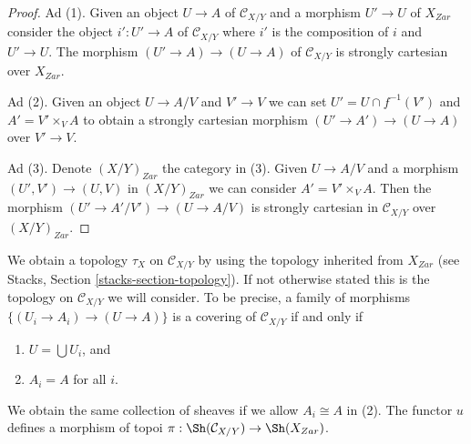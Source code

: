 \begin{proof}
Ad (1). Given an object $U \to A$ of $\mathcal{C}_{X/Y}$ and a morphism
$U' \to U$ of $X_{Zar}$ consider the object $i' : U' \to A$ of
$\mathcal{C}_{X/Y}$ where $i'$ is the composition of $i$ and $U' \to U$.
The morphism $(U' \to A) \to (U \to A)$ of $\mathcal{C}_{X/Y}$
is strongly cartesian over $X_{Zar}$.

\medskip\noindent
Ad (2). Given an object $U \to A/V$ and $V' \to V$ we can set
$U' = U \cap f^{-1}(V')$ and $A' = V' \times_V A$ to obtain a strongly
cartesian morphism $(U' \to A') \to (U \to A)$ over $V' \to V$.

\medskip\noindent
Ad (3). Denote $(X/Y)_{Zar}$ the category in (3). Given $U \to A/V$
and a morphism $(U', V') \to (U, V)$ in $(X/Y)_{Zar}$ we can consider
$A' = V' \times_V A$. Then the morphism $(U' \to A'/V') \to (U \to A/V)$
is strongly cartesian in $\mathcal{C}_{X/Y}$ over $(X/Y)_{Zar}$.
\end{proof}

\noindent
We obtain a topology $\tau_X$ on $\mathcal{C}_{X/Y}$ by
using the topology inherited from $X_{Zar}$ (see
Stacks, Section \ref{stacks-section-topology}). If not otherwise
stated this is the topology on $\mathcal{C}_{X/Y}$ we will consider.
To be precise, a family of morphisms $\{(U_i \to A_i) \to (U \to A)\}$
is a covering of $\mathcal{C}_{X/Y}$ if and only if
\begin{enumerate}
\item $U = \bigcup U_i$, and
\item $A_i = A$ for all $i$.
\end{enumerate}
We obtain the same collection of sheaves if we allow $A_i \cong A$ in (2).
The functor $u$ defines a morphism of topoi
$\pi : \Sh(\mathcal{C}_{X/Y}) \to \Sh(X_{Zar})$.

